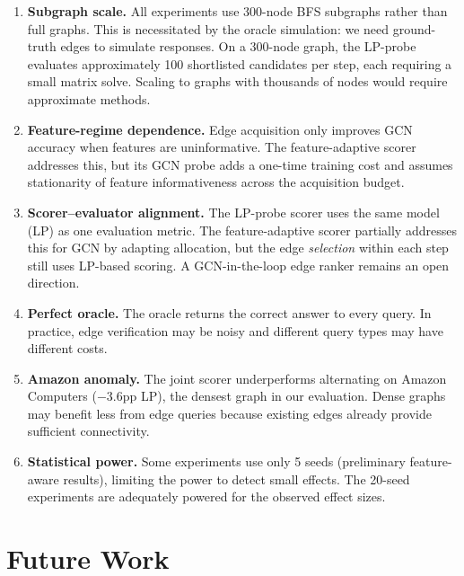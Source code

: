 \documentclass[12pt,a4paper,oneside]{report}
\begin{document}
\begin{enumerate}[leftmargin=2em]
    \item \textbf{Subgraph scale.} All experiments use 300-node BFS subgraphs rather than full graphs. This is necessitated by the oracle simulation: we need ground-truth edges to simulate responses. On a 300-node graph, the LP-probe evaluates approximately 100 shortlisted candidates per step, each requiring a small matrix solve. Scaling to graphs with thousands of nodes would require approximate methods.

    \item \textbf{Feature-regime dependence.} Edge acquisition only improves GCN accuracy when features are uninformative. The feature-adaptive scorer addresses this, but its GCN probe adds a one-time training cost and assumes stationarity of feature informativeness across the acquisition budget.

    \item \textbf{Scorer--evaluator alignment.} The LP-probe scorer uses the same model (LP) as one evaluation metric. The feature-adaptive scorer partially addresses this for GCN by adapting allocation, but the edge \emph{selection} within each step still uses LP-based scoring. A GCN-in-the-loop edge ranker remains an open direction.

    \item \textbf{Perfect oracle.} The oracle returns the correct answer to every query. In practice, edge verification may be noisy and different query types may have different costs.

    \item \textbf{Amazon anomaly.} The joint scorer underperforms alternating on Amazon Computers ($-3.6$pp LP), the densest graph in our evaluation. Dense graphs may benefit less from edge queries because existing edges already provide sufficient connectivity.

    \item \textbf{Statistical power.} Some experiments use only 5 seeds (preliminary feature-aware results), limiting the power to detect small effects. The 20-seed experiments are adequately powered for the observed effect sizes.
\end{enumerate}

\section{Future Work}
\end{document}
